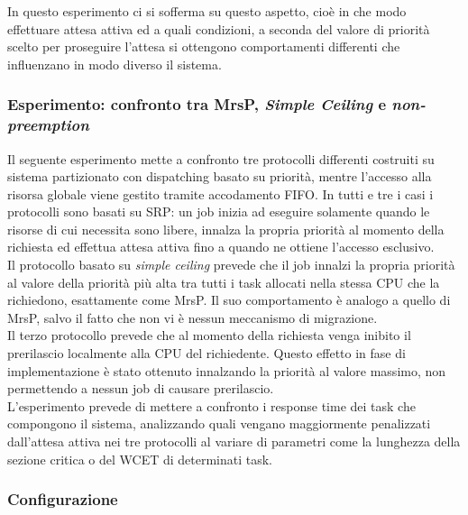 \noindent In questo esperimento ci si sofferma su questo aspetto, cioè in che modo effettuare attesa attiva ed a quali condizioni, a seconda del valore di priorità scelto per proseguire l'attesa si ottengono comportamenti differenti che influenzano in modo diverso il sistema.\\

\subsubsection{Esperimento: confronto tra MrsP, \textit{Simple Ceiling} e \textit{non-preemption}}
\label{sec:confronto_protocolli_exp}

\noindent Il seguente esperimento mette a confronto tre protocolli differenti costruiti su sistema partizionato con dispatching basato su priorità, mentre l'accesso alla risorsa globale viene gestito tramite accodamento FIFO. In tutti e tre i casi i protocolli sono basati su SRP: un job inizia ad eseguire solamente quando le risorse di cui necessita sono libere, innalza la propria priorità al momento della richiesta ed effettua attesa attiva fino a quando ne ottiene l'accesso esclusivo.\\

\noindent Il protocollo basato su \textit{simple ceiling} prevede che il job innalzi la propria priorità al valore della priorità più alta tra tutti i task allocati nella stessa CPU che la richiedono, esattamente come MrsP. Il suo comportamento è analogo a quello di MrsP, salvo il fatto che non vi è nessun meccanismo di migrazione.\\

\noindent Il terzo protocollo prevede che al momento della richiesta venga inibito il prerilascio localmente alla CPU del richiedente. Questo effetto in fase di implementazione è stato ottenuto innalzando la priorità al valore massimo, non permettendo a nessun job di causare prerilascio.\\

\noindent L'esperimento prevede di mettere a confronto i response time dei task che compongono il sistema, analizzando quali vengano maggiormente penalizzati dall'attesa attiva nei tre protocolli al variare di parametri come la lunghezza della sezione critica o del WCET di determinati task.\\

\subsubsection{Configurazione}
\label{sec:confronto_protocolli_conf}

